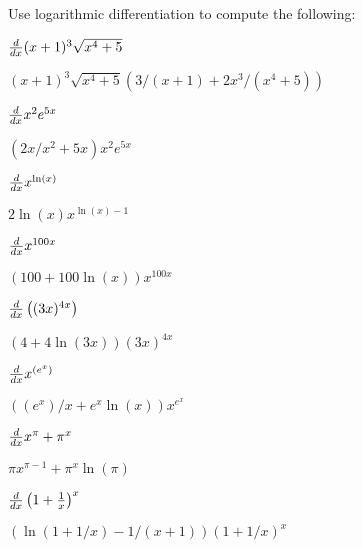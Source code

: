 \begin{exercises}

\noindent Use logarithmic differentiation to compute the following:

\twocol

\begin{exercise}
$\frac{d}{dx} (x+1)^3\sqrt{x^4+5}$
\begin{answer}
$(x+1)^3\sqrt{x^4+5}(3/(x+1) + 2x^3/(x^4+5))$
\end{answer}
\end{exercise}


\begin{exercise}
$\frac{d}{dx} x^2 e^{5x}$
\begin{answer}
$(2x/x^2 + 5x)x^2e^{5x}$
\end{answer}
\end{exercise}


\begin{exercise}
$\frac{d}{dx} x^{\ln(x)}$
\begin{answer}
$2\ln(x)x^{\ln(x)-1}$
\end{answer}
\end{exercise}


\begin{exercise}
$\frac{d}{dx} x^{100 x}$
\begin{answer}
$(100 + 100 \ln(x))x^{100x}$
\end{answer}
\end{exercise}


\begin{exercise}
$\frac{d}{dx} \left((3x)^{4x}\right)$
\begin{answer}
$(4+ 4\ln(3x)) (3x)^{4x}$
\end{answer}
\end{exercise}


\begin{exercise}
$\frac{d}{dx} x^{(e^x)}$
\begin{answer}
$((e^x)/x+ e^x\ln(x))x^{e^x}$
\end{answer}
\end{exercise}


\begin{exercise}
$\frac{d}{dx} x^\pi + \pi^x$
\begin{answer}
$\pi x^{\pi-1} + \pi^x\ln(\pi)$
\end{answer}
\end{exercise}


\begin{exercise}
$\frac{d}{dx}\left(1+\frac{1}{x}\right)^x$
\begin{answer}
$(\ln(1+1/x) - 1/(x+1))(1+1/x)^x$
\end{answer}
\end{exercise}



\end{exercises}
